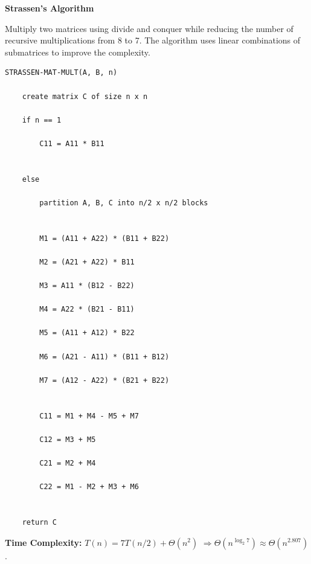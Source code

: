 \documentclass[a4paper,12pt]{article}
\begin{document}
\begin{tcolorbox}[
    colback=gray!30,
    colframe=black,
    boxrule=1pt,
    arc=0mm
]

\begin{tcolorbox}[
    colback=gray!10,
    colframe=black,
    arc=0mm
]
\centering
{\Huge\bfseries Strassen's Algorithm}
\end{tcolorbox}


\begin{tcolorbox}[
    colback=gray!10,
    colframe=black,
    arc=0mm
]
\small
Multiply two matrices using divide and conquer while reducing the number of recursive
multiplications from 8 to 7. The algorithm uses linear combinations of submatrices
to improve the complexity.
\end{tcolorbox}


\begin{tcolorbox}[
    colback=black!5,
    colframe=black,
    arc=0mm,
    title=Pseudo-code
]
\tiny
\begin{lstlisting}
STRASSEN-MAT-MULT(A, B, n)

    create matrix C of size n x n

    if n == 1

        C11 = A11 * B11


    else

        partition A, B, C into n/2 x n/2 blocks


        M1 = (A11 + A22) * (B11 + B22)

        M2 = (A21 + A22) * B11

        M3 = A11 * (B12 - B22)

        M4 = A22 * (B21 - B11)

        M5 = (A11 + A12) * B22

        M6 = (A21 - A11) * (B11 + B12)

        M7 = (A12 - A22) * (B21 + B22)


        C11 = M1 + M4 - M5 + M7

        C12 = M3 + M5

        C21 = M2 + M4

        C22 = M1 - M2 + M3 + M6


    return C
\end{lstlisting}
\end{tcolorbox}


\begin{tcolorbox}[
    colback=cyan!20,
    colframe=black,
    arc=0mm
]
\small
\textbf{Time Complexity:}
$T(n)=7T(n/2)+\Theta(n^2)$
$\Rightarrow \Theta(n^{\log_2 7}) \approx \Theta(n^{2.807})$.
\end{tcolorbox}



\end{tcolorbox}
\end{document}
